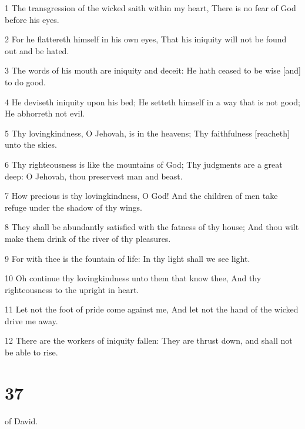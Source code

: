 \par 1 The transgression of the wicked saith within my heart, There is no fear of God before his eyes.
\par 2 For he flattereth himself in his own eyes, That his iniquity will not be found out and be hated.
\par 3 The words of his mouth are iniquity and deceit: He hath ceased to be wise [and] to do good.
\par 4 He deviseth iniquity upon his bed; He setteth himself in a way that is not good; He abhorreth not evil.
\par 5 Thy lovingkindness, O Jehovah, is in the heavens; Thy faithfulness [reacheth] unto the skies.
\par 6 Thy righteousness is like the mountains of God; Thy judgments are a great deep: O Jehovah, thou preservest man and beast.
\par 7 How precious is thy lovingkindness, O God! And the children of men take refuge under the shadow of thy wings.
\par 8 They shall be abundantly satisfied with the fatness of thy house; And thou wilt make them drink of the river of thy pleasures.
\par 9 For with thee is the fountain of life: In thy light shall we see light.
\par 10 Oh continue thy lovingkindness unto them that know thee, And thy righteousness to the upright in heart.
\par 11 Let not the foot of pride come against me, And let not the hand of the wicked drive me away.
\par 12 There are the workers of iniquity fallen: They are thrust down, and shall not be able to rise.

\chapter{37}

\par [A Psalm] of David.

